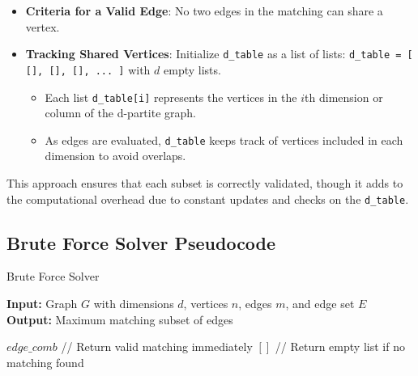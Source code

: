 \begin{itemize}
    \item \textbf{Criteria for a Valid Edge}: No two edges in the matching can share a vertex.
    \item \textbf{Tracking Shared Vertices}: Initialize \texttt{d\_table} as a list of lists: \texttt{d\_table = [ [], [], [], ... ]} with \( d \) empty lists.
    \begin{itemize}
        \item Each list \texttt{d\_table[i]} represents the vertices in the \( i \)th dimension or column of the d-partite graph.
        \item As edges are evaluated, \texttt{d\_table} keeps track of vertices included in each dimension to avoid overlaps.
    \end{itemize}
\end{itemize}

This approach ensures that each subset is correctly validated, though it adds to the computational overhead due to constant updates and checks on the \texttt{d\_table}.

\newpage

\subsection*{Brute Force Solver Pseudocode}

\begin{algorithm}
\caption{Brute Force Solver}
\begin{algorithmic}[1]
\STATE \textbf{Input:} Graph $G$ with dimensions $d$, vertices $n$, edges $m$, and edge set $E$
\STATE \textbf{Output:} Maximum matching subset of edges

            \RETURN $\textit{edge\_comb}$ \hfill // Return valid matching immediately
        \ENDIF
    \ENDFOR
\ENDFOR
\RETURN $[]$ \hfill // Return empty list if no matching found
\end{algorithmic}
\end{algorithm}


